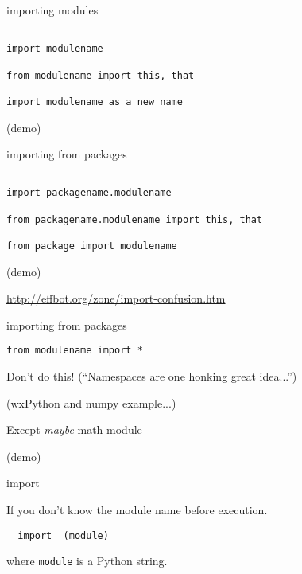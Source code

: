 \documentclass{beamer}
\begin{document}
\begin{frame}[fragile]{importing modules}

\begin{verbatim}

import modulename

from modulename import this, that

import modulename as a_new_name
\end{verbatim}
\vfill
(demo)
\end{frame} 

\begin{frame}[fragile]{importing from packages}

\begin{verbatim}

import packagename.modulename

from packagename.modulename import this, that

from package import modulename

\end{verbatim}
\vfill
(demo)

\vfill
\url{http://effbot.org/zone/import-confusion.htm}

\end{frame} 

\begin{frame}[fragile]{importing from packages}

\begin{verbatim}
from modulename import *
\end{verbatim}

\vfill
{\LARGE Don't do this!}
\vfill
{\Large (``Namespaces are one honking great idea...'')}

\vfill
(wxPython and numpy example...)

\vfill
Except \emph{maybe} math module

\vfill
(demo)
\end{frame} 


\begin{frame}[fragile]{import}

\vfill
If you don’t know the module name before execution.

\vfill
\begin{verbatim}
__import__(module)
\end{verbatim}

\vfill
where \verb+module+ is a Python string.

\vfill
\end{frame}
\end{document}
